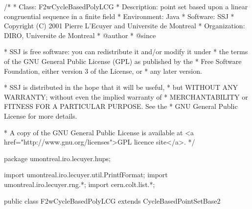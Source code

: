 \begin{code}
\begin{hide}
/*
 * Class:        F2wCycleBasedPolyLCG
 * Description:  point set based upon a linear congruential sequence in a
                 finite field
 * Environment:  Java
 * Software:     SSJ 
 * Copyright (C) 2001  Pierre L'Ecuyer and Universite de Montreal
 * Organization: DIRO, Universite de Montreal
 * @author       
 * @since

 * SSJ is free software: you can redistribute it and/or modify it under
 * the terms of the GNU General Public License (GPL) as published by the
 * Free Software Foundation, either version 3 of the License, or
 * any later version.

 * SSJ is distributed in the hope that it will be useful,
 * but WITHOUT ANY WARRANTY; without even the implied warranty of
 * MERCHANTABILITY or FITNESS FOR A PARTICULAR PURPOSE.  See the
 * GNU General Public License for more details.

 * A copy of the GNU General Public License is available at
   <a href="http://www.gnu.org/licenses">GPL licence site</a>.
 */
\end{hide}
package umontreal.iro.lecuyer.hups; \begin{hide}
import umontreal.iro.lecuyer.util.PrintfFormat;
import umontreal.iro.lecuyer.rng.*;
import cern.colt.list.*;
\end{hide}


public class F2wCycleBasedPolyLCG extends CycleBasedPointSetBase2 \begin{hide} {

   private F2wStructure param;
\end{hide}\end{code}


